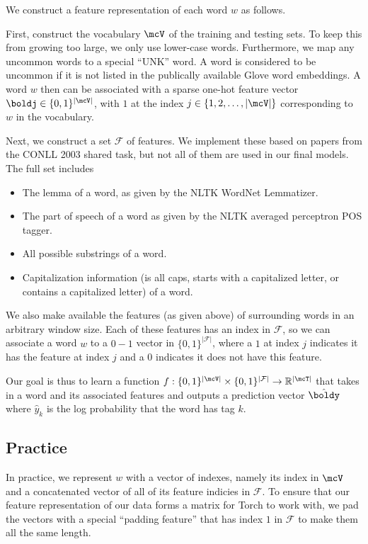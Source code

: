 \documentclass[11pt]{article}
\begin{document}
We construct a feature representation of each word $w$ as follows. 

First, construct the vocabulary $\mcV$ of the training and testing sets. To keep this from growing too large, we only use lower-case words. Furthermore, we map any uncommon words to a special ``UNK'' word. A word is considered to be uncommon if it is not listed in the publically available Glove word embeddings. A word $w$ then can be associated with a sparse one-hot feature vector $\boldj \in \{0,1\}^{|\mcV|}$, with $1$ at the index $j \in \{1, 2, \dots, |\mcV|\}$ corresponding to $w$ in the vocabulary. 

Next, we construct a set $\mathcal{F}$ of features. We implement these based on papers from the CONLL 2003 shared task, but not all of them are used in our final models. The full set includes
\begin{itemize}
  \item The lemma of a word, as given by the NLTK WordNet Lemmatizer. 
  \item The part of speech of a word as given by the NLTK averaged perceptron POS tagger. 
  \item All possible substrings of a word. 
  \item Capitalization information (is all caps, starts with a capitalized letter, or contains a capitalized letter) of a word.
\end{itemize}

We also make available the features (as given above) of surrounding words in an arbitrary window size. Each of these features has an index in $\mathcal{F}$, so we can associate a word $w$ to a $0-1$ vector in $\{0,1\}^{|\mathcal{F}|}$, where a $1$ at index $j$ indicates it has the feature at index $j$ and a $0$ indicates it does not have this feature. 

Our goal is thus to learn a function $f: \{0,1\}^{|\mcV|} \times \{0,1\}^{|\mathcal{F}|} \to \mathbb{R}^{|\mcT|}$ that takes in a word and its associated features and outputs a prediction vector $\hat{\boldy}$ where $\hat{y}_k$ is the log probability that the word has tag $k$. 

\subsection{Practice}

In practice, we represent $w$ with a vector of indexes, namely its index in $\mcV$ and a concatenated vector of all of its feature indicies in $\mathcal{F}$. To ensure that our feature representation of our data forms a matrix for Torch to work with, we pad the vectors with a special ``padding feature'' that has index $1$ in $\mathcal{F}$ to make them all the same length. 
\end{document}
